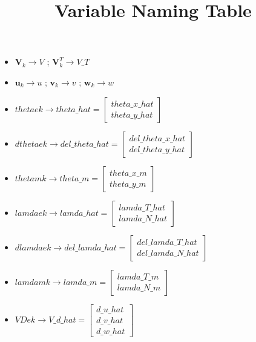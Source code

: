 \documentclass[UTF8,12pt,a4paper]{ctexart}
\title{\textbf{Variable Naming Table}}
\author{}
\date{}
\begin{document}
\maketitle

\begin{itemize}[itemsep=6pt]


\item $\mathbf{V}_k \to V$ \;;\; $\mathbf{V}_k^T \to V\_T$

\item $\mathbf{u}_k \to u$ \;;\; $\mathbf{v}_k \to v$ \;;\; $\mathbf{w}_k \to w$

\item $thetaek \to theta\_hat = \begin{bmatrix} theta\_x\_hat \\ theta\_y\_hat \end{bmatrix}$

\item $dthetaek \to del\_theta\_hat = \begin{bmatrix} del\_theta\_x\_hat \\ del\_theta\_y\_hat \end{bmatrix}$

\item $thetamk \to theta\_m = \begin{bmatrix} theta\_x\_m \\ theta\_y\_m \end{bmatrix}$

\item $lamdaek \to lamda\_hat = \begin{bmatrix} lamda\_T\_hat \\ lamda\_N\_hat \end{bmatrix}$

\item $dlamdaek \to del\_lamda\_hat = \begin{bmatrix} del\_lamda\_T\_hat \\ del\_lamda\_N\_hat \end{bmatrix}$

\item $lamdamk \to lamda\_m = \begin{bmatrix} lamda\_T\_m \\ lamda\_N\_m \end{bmatrix}$

\item $VDek \to V\_d\_hat = \begin{bmatrix} d\_u\_hat \\ d\_v\_hat \\ d\_w\_hat \end{bmatrix}$


\end{itemize}
\end{document}
